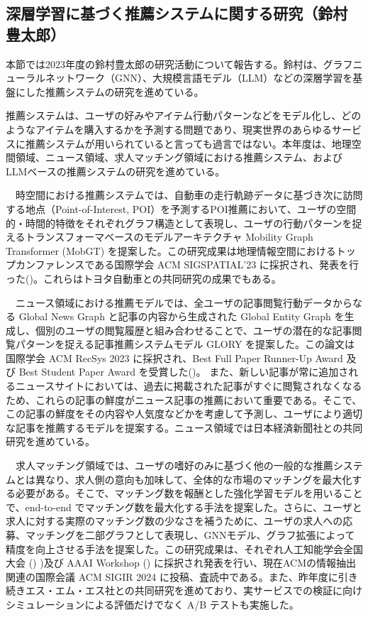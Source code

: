 
\subsection{深層学習に基づく推薦システムに関する研究（鈴村　豊太郎）}

本節では2023年度の鈴村豊太郎の研究活動について報告する。鈴村は、グラフニューラルネットワーク（GNN）、大規模言語モデル（LLM）などの深層学習を基盤にした推薦システムの研究を進めている。

推薦システムは、ユーザの好みやアイテム行動パターンなどをモデル化し、どのようなアイテムを購入するかを予測する問題であり、現実世界のあらゆるサービスに推薦システムが用いられていると言っても過言ではない。本年度は、地理空間領域、ニュース領域、求人マッチング領域における推薦システム、およびLLMベースの推薦システムの研究を進めている。

　時空間における推薦システムでは、自動車の走行軌跡データに基づき次に訪問する地点（Point-of-Interest, POI）を予測するPOI推薦において、ユーザの空間的・時間的特徴をそれぞれグラフ構造として表現し、ユーザの行動パターンを捉えるトランスフォーマベースのモデルアーキテクチャ Mobility Graph Transformer (MobGT) を提案した。この研究成果は地理情報空間におけるトップカンファレンスである国際学会 ACM SIGSPATIAL'23 に採択され、発表を行った(\cite{mobgt})。これらはトヨタ自動車との共同研究の成果でもある。

　ニュース領域における推薦モデルでは、全ユーザの記事閲覧行動データからなる Global News Graph と記事の内容から生成された Global Entity Graph を生成し、個別のユーザの閲覧履歴と組み合わせることで、ユーザの潜在的な記事閲覧パターンを捉える記事推薦システムモデル GLORY を提案した。この論文は国際学会 ACM RecSys 2023 に採択され、Best Full Paper Runner-Up Award 及び Best Student Paper Award を受賞した(\cite{glory})。
また、新しい記事が常に追加されるニュースサイトにおいては、過去に掲載された記事がすぐに閲覧されなくなるため、これらの記事の鮮度がニュース記事の推薦において重要である。そこで、この記事の鮮度をその内容や人気度などかを考慮して予測し、ユーザにより適切な記事を推薦するモデルを提案する。ニュース領域では日本経済新聞社との共同研究を進めている。

　求人マッチング領域では、ユーザの嗜好のみに基づく他の一般的な推薦システムとは異なり、求人側の意向も加味して、全体的な市場のマッチングを最大化する必要がある。そこで、マッチング数を報酬とした強化学習モデルを用いることで、end-to-end でマッチング数を最大化する手法を提案した。さらに、ユーザと求人に対する実際のマッチング数の少なさを補うために、ユーザの求人への応募、マッチングを二部グラフとして表現し、GNNモデル、グラフ拡張によって精度を向上させる手法を提案した。この研究成果は、それぞれ人工知能学会全国大会 (\cite{job-jsai})
)及び AAAI Workshop (\cite{job-aaai}) に採択され発表を行い、現在ACMの情報抽出関連の国際会議 ACM SIGIR 2024 に投稿、査読中である。また、昨年度に引き続きエス・エム・エス社との共同研究を進めており、実サービスでの検証に向けシミュレーションによる評価だけでなく A/B テストも実施した。

